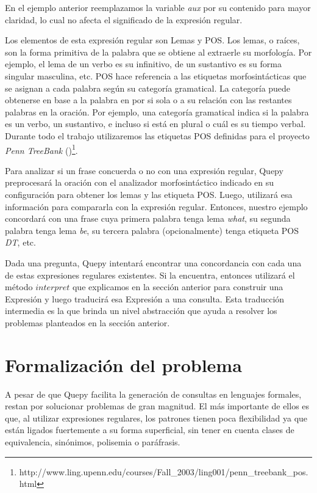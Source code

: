 En el ejemplo anterior reemplazamos la variable \textit{aux} por su contenido para mayor claridad, lo cual no afecta el significado de la expresión regular.

Los elementos de esta expresión regular son Lemas y POS. Los lemas, o raíces, son la forma primitiva de la palabra que se obtiene al extraerle su morfología. Por ejemplo, el lema de un verbo es su infinitivo, de un sustantivo es su forma singular masculina, etc. POS hace referencia a las etiquetas morfosintácticas que se asignan a cada palabra según su categoría gramatical. La categoría puede obtenerse en base a la palabra en por si sola o a su relación con las restantes palabras en la oración. Por ejemplo, una categoría gramatical indica si la palabra es un verbo, un sustantivo, e incluso si está en plural o cuál es su tiempo verbal. Durante todo el trabajo utilizaremos las etiquetas POS definidas para el proyecto \textit{Penn TreeBank} (\citet{penntreebank})\footnote{http://www.ling.upenn.edu/courses/Fall\_2003/ling001/penn\_treebank\_pos.html}.

Para analizar si un frase concuerda o no con una expresión regular, Quepy preprocesará la oración con el analizador morfosintáctico indicado en su configuración para obtener los lemas y las etiqueta POS. Luego, utilizará esa información para compararla con la expresión regular. Entonces, nuestro ejemplo concordará con una frase cuya primera palabra tenga lema \textit{what}, su segunda palabra tenga lema \textit{be}, su tercera palabra (opcionalmente) tenga etiqueta POS \textit{DT}, etc.

Dada una pregunta, Quepy intentará encontrar una concordancia con cada una de estas expresiones regulares existentes. Si la encuentra, entonces utilizará el método $interpret$ que explicamos en la sección anterior para construir una Expresión y luego traducirá esa Expresión a una consulta. Esta traducción intermedia es la que brinda un nivel abstracción que ayuda a resolver los problemas planteados en la sección anterior.

\chapter{Formalización del problema}

A pesar de que Quepy facilita la generación de consultas en lenguajes formales, restan por solucionar problemas de gran magnitud. El más importante de ellos es que, al utilizar expresiones regulares, los patrones tienen poca flexibilidad ya que están ligados fuertemente a su forma superficial, sin tener en cuenta clases de equivalencia, sinónimos, polisemia o paráfrasis.

